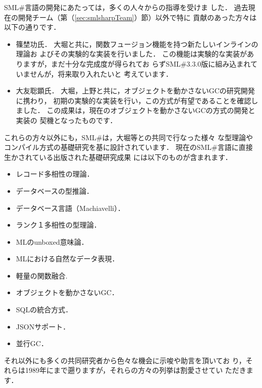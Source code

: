 \documentclass{jbook}
\newcommand{\smlsharp}{SML\#}
\newcommand{\version}{3.3.0}
\begin{document}
\ifjp%
	\smlsharp{}言語の開発にあたっては，多くの人々からの指導を受けま
した．
	過去現在の開発チーム（第（\ref{sec:smlsharpTeam}）節）以外で特に
貢献のあった方々は以下の通りです．
\begin{itemize}
\item 篠埜功氏．
	大堀と共に，関数フュージョン機能を持つ新たしいインラインの理論お
よびその実験的な実装を行いました．
	この機能は実験的な実装がありますが，まだ十分な完成度が得られてお
らず\smlsharp{}\version{}版に組み込まれていませんが，将来取り入れたいと
考えています．
\item 大友聡顕氏．
	大堀，上野と共に，オブジェクトを動かさないGCの研究開発に携わり，
初期の実験的な実装を行い，この方式が有望であることを確認しました．
	この成果は，現在のオブジェクトを動かさないGCの方式の開発と実装の
契機となったものです．
\end{itemize}
	これらの方々以外にも，\smlsharp{}は，大堀等との共同で行なった様々
な型理論やコンパイル方式の基礎研究を基に設計されています．
	現在の\smlsharp{}言語に直接生かされている出版された基礎研究成果
には以下のものが含まれます．
\begin{itemize}
\item レコード多相性の理論\cite{ohor92popl,ohor95toplas}．
\item データベースの型推論\cite{ohor88lfp}．
\item データベース言語（Machiavelli）\cite{ohor89sigmod,bune96tods}．
\item ランク１多相性の型理論\cite{ohor99icfp}．
\item MLのunboxed意味論\cite{ohor97unbox}．
\item MLにおける自然なデータ表現\cite{nguyen06ppdp}．
\item 軽量の関数融合\cite{ohor07popl}.
\item オブジェクトを動かさないGC\cite{ueno11icfp}．
\item SQLの統合方式\cite{ohori11icfp}．
\item JSONサポート\cite{ohori15ecoop}．
\item 並行GC\cite{ueno16icfp}．
\end{itemize}
	それ以外にも多くの共同研究者から色々な機会に示唆や助言を頂いてお
り，それらは1989年にまで遡りますが，それらの方々の列挙は割愛させてい
ただきます．
\else%
\end{document}
